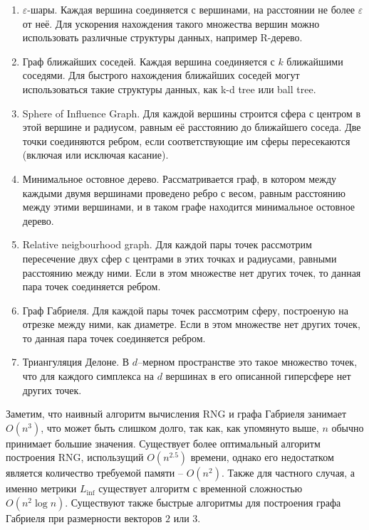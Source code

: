 \documentclass{article}
\begin{document}
\begin{enumerate}
	\item $\varepsilon$-шары. Каждая вершина соединяется с вершинами, на расстоянии не более $\varepsilon$ от неё. Для ускорения нахождения такого множества вершин можно использовать различные структуры данных, например R-дерево.
	
	\item Граф ближайших соседей. Каждая вершина соединяется с $k$ ближайшими соседями. Для быстрого нахождения ближайших соседей могут использоваться такие структуры данных, как k-d tree или ball tree.
	
	\item Sphere of Influence Graph. Для каждой вершины строится сфера с центром в этой вершине и радиусом, равным её расстоянию до ближайшего соседа. Две точки соединяются ребром, если соответствующие им сферы пересекаются (включая или исключая касание).	
	
	\item Минимальное остовное дерево. Рассматривается граф, в котором между каждыми двумя вершинами проведено ребро с весом, равным расстоянию между этими вершинами, и в таком графе находится минимальное остовное дерево.
	
	\item Relative neigbourhood graph. Для каждой пары точек рассмотрим пересечение двух сфер с центрами в этих точках и радиусами, равными расстоянию между ними. Если в этом множестве нет других точек, то данная пара точек соединяется ребром.
	
	\item Граф Габриеля. Для каждой пары точек рассмотрим сферу, построеную на отрезке между ними, как диаметре. Если в этом множестве нет других точек, то данная пара точек соединяется ребром.
	
	\item Триангуляция Делоне. В $d$--мерном пространстве это такое множество точек, что для каждого симплекса на $d$ вершинах в его описанной гиперсфере нет других точек.

\end{enumerate}

Заметим, что наивный алгоритм вычисления RNG и графа Габриеля занимает $O(n^3)$, что может быть слишком долго, так как, как упомянуто выше, $n$ обычно принимает большие значения.
Существует более оптимальный алгоритм построения RNG, использущий $O(n^{2.5})$ времени, однако его недостатком является количество требуемой памяти -- $O(n^2)$. Также для частного случая, а именно метрики $L_{\inf}$ существует алгоритм с временной сложностью $O(n^2 \log n)$\cite{some_case_dg}.
Существуют также быстрые алгоритмы для построения графа Габриеля при размерности векторов $2$ или $3$\cite{some_case_gabr}.
\end{document}
